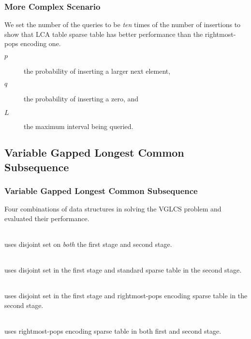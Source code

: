 \begin{withoutheadline}
\begin{frame}
	\frametitle{More Complex Scenario}
	We set the number of the queries to be {\em ten} times of the number
	of insertions to show that LCA table sparse table has better
	performance than the rightmost-pops encoding one.
	
	\begin{description}
		\item[$p$]
			the probability of inserting a larger next element,
		\item[$q$]
			the probability of inserting a zero, and
		\item[$L$]
			the maximum interval being queried.
	\end{description}
	\begin{center}
	\scalebox{0.65} { \begin{minipage}{1.53\textwidth}
			
			\end{minipage}
		}
	\end{center}
\end{frame}
\end{withoutheadline}

\subsection{Variable Gapped Longest Common Subsequence}

\begin{withoutheadline}
\begin{frame}
    \frametitle{Variable Gapped Longest Common Subsequence}
	Four combinations of data structures in solving the VGLCS problem
	and evaluated their performance.

	\begin{description}
		\setlength\itemsep{0.5em}
		\item[Peng's algorithm] \hfill \\
			uses disjoint set on {\em both} the first stage and second stage.
		\item[{\sc DS-ST}] \hfill \\
			uses disjoint set in the first stage and standard sparse table in the
			second stage.
		\item[{\sc DS-BST}] \hfill \\
			uses disjoint set in the first stage and rightmost-pops
			encoding sparse table in the second stage.
		\item[{\sc BST2}] \hfill \\
			uses rightmost-pops encoding sparse table in both first and
			second stage.
	\end{description}
\end{frame}
\end{withoutheadline}

